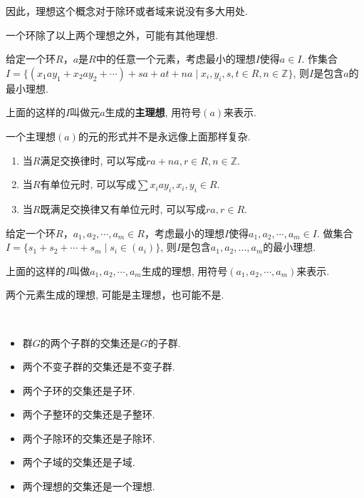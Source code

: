 \begin{Note}
因此，理想这个概念对于除环或者域来说没有多大用处.
\end{Note}

\begin{Note}
一个环除了以上两个理想之外，可能有其他理想.
\end{Note}

\begin{Proposition}
给定一个环$R$，$a$是$R$中的任意一个元素，考虑最小的理想$I$使得$a \in I$. 作集合
$I = \{ \left( x_1 a y_1 + x_2 a y_2 + \cdots \right) + s a + a t + na \mid
x_i, y_i, s, t \in R, n \in \mathbb{Z} \}$, 则$I$是包含$a$的最小理想.
\end{Proposition}

\begin{Definition}[主理想]
上面的这样的$I$叫做元$a$生成的\textbf{主理想}, 用符号$(a)$来表示.
\end{Definition}

\begin{Note}
一个主理想$(a)$的元的形式并不是永远像上面那样复杂.
\begin{enumerate}
	\item 当$R$满足交换律时, 可以写成$ra + na, r \in R, n \in \mathbb{Z}$.
	\item 当$R$有单位元时, 可以写成$ \displaystyle \sum x_i a y_i, x_i, y_i \in R $.

	\item 当$R$既满足交换律又有单位元时, 可以写成$ \displaystyle ra, r \in R $.
\end{enumerate}
\end{Note}

\begin{Proposition}
给定一个环$R$，$a_1, a_2, \cdots, a_m \in R$，考虑最小的理想$I$使得$a_1, a_2, \cdots, a_m \in I$.
做集合$I = \{ s_1 + s_2 + \cdots + s_m \mid s_i \in (a_i) \}$, 
则$I$是包含$a_1, a_2, \dots, a_m$的最小理想.
\end{Proposition}

\begin{Definition}
上面的这样的$I$叫做$a_1, a_2, \cdots, a_m$生成的理想, 用符号$(a_1, a_2, \cdots, a_m)$来表示.
\end{Definition}

\begin{Note}
两个元素生成的理想, 可能是主理想，也可能不是.
\end{Note}

\begin{Proposition} \ \\
\begin{itemize}
\item 群$G$的两个子群的交集还是$G$的子群.
\item 两个不变子群的交集还是不变子群.
\item 两个子环的交集还是子环.
\item 两个子整环的交集还是子整环.
\item 两个子除环的交集还是子除环.
\item 两个子域的交集还是子域.
\item 两个理想的交集还是一个理想.
\end{itemize}
\end{Proposition}

